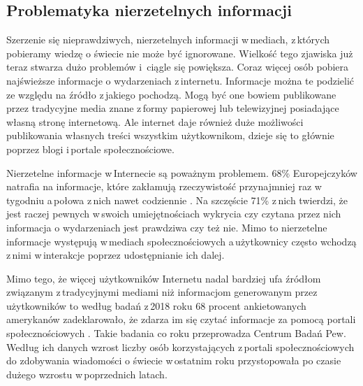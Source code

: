 \subsection{Problematyka nierzetelnych informacji}
Szerzenie się nieprawdziwych, nierzetelnych informacji w\,mediach, z\,których pobieramy wiedzę o świecie nie może być ignorowane. Wielkość tego zjawiska już teraz stwarza dużo problemów i \,ciągle się powiększa. Coraz więcej osób pobiera najświeższe informacje o wydarzeniach z\,internetu. Informacje można te podzielić ze względu na źródło z\,jakiego pochodzą. Mogą być one bowiem publikowane przez tradycyjne media znane z\,formy papierowej lub telewizyjnej posiadające własną stronę internetową. Ale internet daje również duże możliwości publikowania własnych treści wszystkim użytkownikom, dzieje się to głównie poprzez blogi i\,portale społecznościowe.  \par
Nierzetelne informacje w\,Internecie są poważnym problemem. 68\% Europejczyków natrafia na informacje, które zakłamują rzeczywistość przynajmniej raz w\,tygodniu a\,połowa z\,nich nawet codziennie \cite{Eurobarometer4642018}. Na szczęście 71\% z\,nich twierdzi, że jest raczej pewnych w\,swoich umiejętnościach wykrycia czy czytana przez nich informacja o wydarzeniach jest prawdziwa czy też nie. Mimo to nierzetelne informacje występują w\,mediach społecznościowych a\,użytkownicy często wchodzą z\,nimi w\,interakcje poprzez udostępnianie ich dalej.
\par Mimo tego, że więcej użytkowników Internetu nadal bardziej ufa źródłom związanym z\,tradycyjnymi mediami niż informacjom generowanym przez użytkowników \cite{rieh2014credibility} to według badań z\,2018 roku 68 procent ankietowanych amerykanów zadeklarowało, że zdarza im się czytać informacje za pomocą portali społecznościowych \cite{PewNewsUse2018}. Takie badania co roku przeprowadza Centrum Badań Pew. Według ich danych wzrost liczby osób korzystających z\,portali społecznościowych do zdobywania wiadomości o świecie w\,ostatnim roku przystopowała po czasie dużego wzrostu w\,poprzednich latach.

